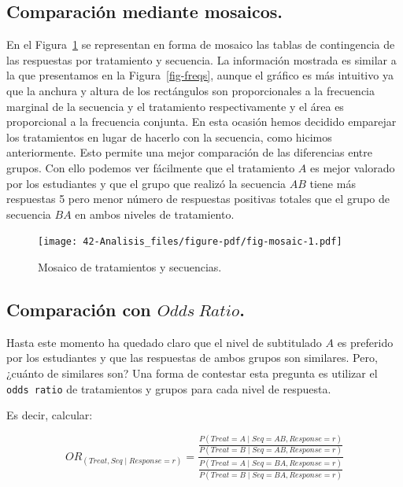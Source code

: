 \documentclass[
  12pt,
  a4paper,
  extrafontsizes,
  onecolumn,
  openright]{memoir}
\begin{document}
\hypertarget{comparaciuxf3n-mediante-mosaicos.}{%
\subsection{Comparación mediante
mosaicos.}\label{comparaciuxf3n-mediante-mosaicos.}}

En el Figura~\ref{fig-mosaic} se representan en forma de mosaico las
tablas de contingencia de las respuestas por tratamiento y secuencia. La
información mostrada es similar a la que presentamos en la
Figura~\ref{fig-freqs}, aunque el gráfico es más intuitivo ya que la
anchura y altura de los rectángulos son proporcionales a la frecuencia
marginal de la secuencia y el tratamiento respectivamente y el área es
proporcional a la frecuencia conjunta. En esta ocasión hemos decidido
emparejar los tratamientos en lugar de hacerlo con la secuencia, como
hicimos anteriormente. Esto permite una mejor comparación de las
diferencias entre grupos. Con ello podemos ver fácilmente que el
tratamiento \(A\) es mejor valorado por los estudiantes y que el grupo
que realizó la secuencia \(AB\) tiene más respuestas 5 pero menor número
de respuestas positivas totales que el grupo de secuencia \(BA\) en
ambos niveles de tratamiento.

\begin{figure}[h]

{\centering \texttt{[image: 42-Analisis\_files/figure-pdf/fig-mosaic-1.pdf]}

}

\caption{\label{fig-mosaic}Mosaico de tratamientos y secuencias.}

\end{figure}

\hypertarget{sec-or}{%
\subsection{\texorpdfstring{Comparación con
\(Odds\ Ratio\).}{Comparación con Odds\textbackslash{} Ratio.}}\label{sec-or}}

Hasta este momento ha quedado claro que el nivel de subtitulado \(A\) es
preferido por los estudiantes y que las respuestas de ambos grupos son
similares. Pero, ¿cuánto de similares son? Una forma de contestar esta
pregunta es utilizar el \texttt{odds\ ratio} de tratamientos y grupos
para cada nivel de respuesta.

Es decir, calcular:

\begin{equation}
OR_{(Treat, Seq \mid Response=r)}=\frac{
    \frac{
            P(Treat=A \mid Seq=AB, Response=r)
        }{
            P(Treat=B \mid Seq=AB, Response=r)
        }
    }
    {\frac{
        P(Treat=A \mid Seq=BA, Response=r)
        }{
        P(Treat=B \mid Seq=BA, Response=r)
    }
}
\end{equation}
\end{document}

